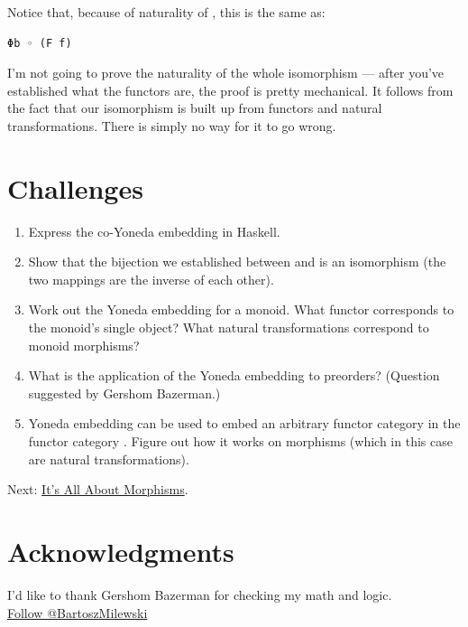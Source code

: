 Notice that, because of naturality of , this is the same as:

\begin{Verbatim}[commandchars=\\\{\}]
Φb ◦ (F f)
\end{Verbatim}

I'm not going to prove the naturality of the whole isomorphism --- after
you've established what the functors are, the proof is pretty
mechanical. It follows from the fact that our isomorphism is built up
from functors and natural transformations. There is simply no way for it
to go wrong.

\section{Challenges}\label{challenges}

\begin{enumerate}
\tightlist
\item
  Express the co-Yoneda embedding in Haskell.
\item
  Show that the bijection we established between  and
   is an isomorphism (the two mappings are the inverse of
  each other).
\item
  Work out the Yoneda embedding for a monoid. What functor corresponds
  to the monoid's single object? What natural transformations correspond
  to monoid morphisms?
\item
  What is the application of the  Yoneda embedding to
  preorders? (Question suggested by Gershom Bazerman.)
\item
  Yoneda embedding can be used to embed an arbitrary functor category
  \code{{[}C,\ D{]}} in the functor category
  \code{{[}{[}C,\ D{]},\ Set{]}}. Figure out how it works on morphisms
  (which in this case are natural transformations).
\end{enumerate}

Next:
\href{https://bartoszmilewski.com/2015/11/17/its-all-about-morphisms/}{It's
All About Morphisms}.

\section{Acknowledgments}\label{acknowledgments}

I'd like to thank Gershom Bazerman for checking my math and logic.\\
\href{https://twitter.com/BartoszMilewski}{Follow @BartoszMilewski}
